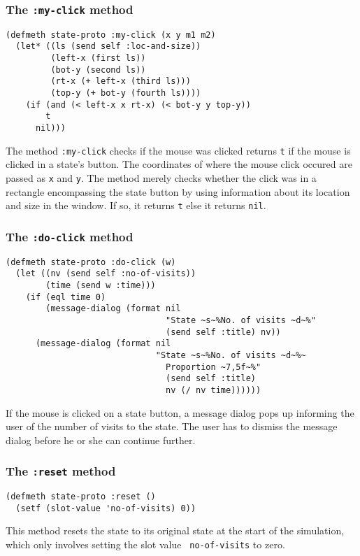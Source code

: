 \subsubsection{The {\tt :my-click} method}
\label{subsubsec:my-click}
\begin{verbatim}
(defmeth state-proto :my-click (x y m1 m2)
  (let* ((ls (send self :loc-and-size))
         (left-x (first ls))
         (bot-y (second ls))
         (rt-x (+ left-x (third ls)))
         (top-y (+ bot-y (fourth ls))))
    (if (and (< left-x x rt-x) (< bot-y y top-y))
        t
      nil)))
\end{verbatim}
The method {\tt :my-click} checks if the mouse was clicked returns
{\tt t} if the mouse is clicked in a state's button.  The coordinates
of where the mouse click occured are passed as {\tt x} and {\tt y}.
The method merely checks whether the click was in a rectangle
encompassing the state button by using information about its location
and size in the window.  If so, it returns {\tt t} else it returns
{\tt nil}. 


\subsubsection{The {\tt :do-click} method}
\label{subsubsec:states-do-click}
\begin{verbatim}
(defmeth state-proto :do-click (w)
  (let ((nv (send self :no-of-visits))
        (time (send w :time)))
    (if (eql time 0)
        (message-dialog (format nil 
                                "State ~s~%No. of visits ~d~%"
                                (send self :title) nv))
      (message-dialog (format nil 
                              "State ~s~%No. of visits ~d~%~
                                Proportion ~7,5f~%"
                                (send self :title) 
                                nv (/ nv time))))))
\end{verbatim}
If the mouse is clicked on a state button, a message dialog pops up
informing the user of the number of visits to the state. The user has
to dismiss the message dialog before he or she can continue further.

\subsubsection{The {\tt :reset} method}
\label{subsubsec:states-reset}
\begin{verbatim}
(defmeth state-proto :reset ()
  (setf (slot-value 'no-of-visits) 0))
\end{verbatim}
This method resets the state to its original state at the start of the
simulation, which only involves setting the slot value {\tt
  no-of-visits} to zero. 

